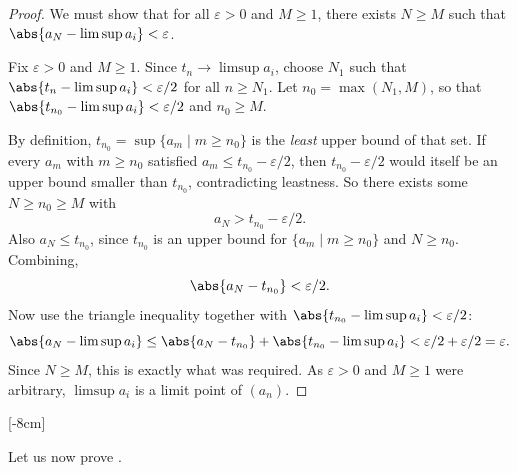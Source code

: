 \begin{proof}
We must show that for all $\varepsilon > 0$ and $M \ge 1$, there exists $N \ge M$ such that
    $\abs{a_N - \limsup a_i} < \varepsilon$.

    Fix $\varepsilon > 0$ and $M \ge 1$. Since $t_n \to \limsup a_i$, choose $N_1$ such that
    $\abs{t_n - \limsup a_i} < \varepsilon/2$ for all $n \ge N_1$. Let $n_0 = \max(N_1, M)$, so that
    $\abs{t_{n_0} - \limsup a_i} < \varepsilon/2$ and $n_0 \ge M$.

    By definition, $t_{n_0} = \sup\{a_m \mid m \ge n_0\}$ is the \emph{least} upper
    bound of that set. If every $a_m$ with $m \ge n_0$ satisfied
    $a_m \le t_{n_0} - \varepsilon/2$, then $t_{n_0} - \varepsilon/2$ would itself be an
    upper bound smaller than $t_{n_0}$, contradicting leastness. So there exists some
    $N \ge n_0 \ge M$ with
    \[
        a_N > t_{n_0} - \varepsilon/2.
    \]
    Also $a_N \le t_{n_0}$, since $t_{n_0}$ is an upper bound for $\{a_m \mid m \ge n_0\}$
    and $N \ge n_0$. Combining,
    \[
        \abs{a_N - t_{n_0}} < \varepsilon/2.
    \]
    Now use the triangle inequality together with $\abs{t_{n_0} - \limsup a_i} < \varepsilon/2$:
    \[
        \abs{a_N - \limsup a_i} \le \abs{a_N - t_{n_0}} + \abs{t_{n_0} - \limsup a_i} < \varepsilon/2 + \varepsilon/2 = \varepsilon.
    \]
    Since $N \ge M$, this is exactly what was required. As $\varepsilon > 0$ and $M \ge 1$
    were arbitrary, $\limsup a_i$ is a limit point of $(a_n)$.
\end{proof}

[-8cm]

Let us now prove .
\cauchyconvergence*

